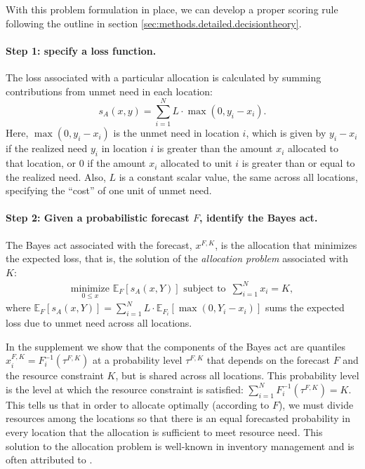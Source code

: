\documentclass{article}\usepackage[]{graphicx}\usepackage[]{xcolor}
\begin{document}
With this problem formulation in place, we can develop a proper scoring rule following the outline in section \ref{sec:methods.detailed.decisiontheory}.

\paragraph{Step 1: specify a loss function.} The loss associated with a particular allocation is calculated by summing contributions from unmet need in each location:
\begin{equation}
s_A(x, y) = \sum_{i=1}^N L \cdot \max(0, y_i - x_i). \label{eqn:loss_fn}
\end{equation}
Here, $\max(0, y_i - x_i)$ is the unmet need in location $i$, which is given by $y_i - x_i$ if the realized need $y_i$ in location $i$ is greater than the amount $x_i$ allocated to that location, or $0$ if the amount $x_i$ allocated to unit $i$ is greater than or equal to the realized need. Also, $L$ is a constant scalar value, the same across all locations, specifying the ``cost'' of one unit of unmet need.

\paragraph{Step 2: Given a probabilistic forecast $F$, identify the Bayes act.} The Bayes act associated with the forecast, $x^{F,K}$, is the allocation that minimizes the expected loss, that is, the solution of the \emph{allocation problem} associated with $K$:
\begin{align}
    \underset{0 \leq x}{\mathrm{minimize}}\,\, \mathbb{E}_{F} [s_A(x, Y)] \text{ subject to }
     \, \sum_{i=1}^N x_i = K, \label{AP}
\end{align}
where $\mathbb{E}_{F} [s_A(x, Y)] = \sum_{i=1}^{N} L \cdot \mathbb{E}_{F_i}[\max(0, Y_i - x_i)]$ sums the expected loss due to unmet need across all locations.

In the supplement we show that the components of the Bayes act are quantiles $x_i^{F,K} = F_i^{-1}(\tau^{F,K})$ at a probability level $\tau^{F,K}$ that depends on the forecast $F$ and the resource constraint $K$, but is shared across all locations.
This probability level is the level at which the resource constraint is satisfied: $\sum_{i=1}^N F_i^{-1}(\tau^{F,K}) = K$.
This tells us that in order to allocate optimally (according to $F$), we must divide resources among the locations so that there is an equal forecasted probability in every location that the allocation is sufficient to meet resource need.
This solution to the allocation problem is well-known in inventory management and is often attributed to \cite{hadleywhitin1963}.
\end{document}
